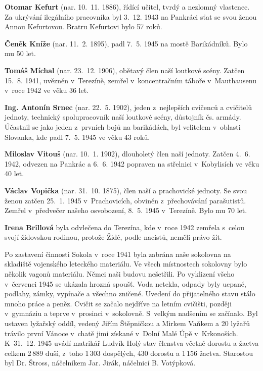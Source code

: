 \documentclass[a5paper, 11pt, twoside]{article}
\begin{document}
\textbf{Otomar Kefurt} (nar. 10.~11. 1886), řídící učitel, tvrdý a
nezlomný vlastenec. Za ukrývání ilegálního pracovníka byl 3.~12. 1943 na
Pankráci sťat se svou ženou Annou Kefurtovou. Bratru Kefurtovi bylo 57
roků.

\textbf{Čeněk Kníže} (nar. 11.~2. 1895), padl 7.~5. 1945 na mostě
Barikádníků. Bylo mu 50 let.

\textbf{Tomáš Míchal} (nar. 23.~12. 1906), obětavý člen naší loutkové
scény. Zatčen 15.~8. 1941, uvězněn v~Terezíně, zemřel v~koncentračním
táboře v~Mauthausenu v~roce 1942 ve věku 36 let.

\textbf{Ing. Antonín Srnec} (nar. 22.~5. 1902), jeden z~nejlepších
cvičenců a cvičitelů jednoty, technický spolupracovník naší loutkové
scény, důstojník čs. armády. Účastnil se jako jeden z~prvních bojů na
barikádách, byl velitelem v~oblasti Slovanka, kde padl 7.~5. 1945 ve
věku 43 roků.

\textbf{Miloslav Vitouš} (nar. 10.~1. 1902), dlouholetý člen naší
jednoty. Zatčen 4.~6. 1942, odvezen na Pankrác a 6.~6. 1942 popraven na
střelnici v~Kobylisích ve věku 40 let.

\textbf{Václav Vopička} (nar. 31.~10. 1875), člen naší a prachovické
jednoty. Se svou ženou zatčen 25.~1. 1945 v~Prachovicích, obviněn
z~přechovávání parašutistů. Zemřel v~předvečer našeho osvobození, 8.~5.
1945 v~Terezíně. Bylo mu 70 let.

\textbf{Irena Brillová} byla odvlečena do Terezína, kde v~roce 1942
zemřela s~celou svojí židovskou rodinou, protože Židé, podle nacistů,
neměli právo žít.

Po zastavení činnosti Sokola v~roce 1941 byla zabrána naše sokolovna na
skladiště vojenského leteckého materiálu. Ve všech místnostech sokolovny
bylo několik vagonů materiálu. Němci naši budovu nešetřili. Po vyklizení
všeho v~červenci 1945 se ukázala hrozná spoušť. Voda netekla, odpady
byly ucpané, podlahy, zámky, vypínače a všechno zničené. Uvedení do
přijatelného stavu stálo mnoho práce a peněz. Cvičit se začalo nejdříve
na letním cvičišti, později v~gymnáziu a teprve v~prosinci v~sokolovně.
S~velkým nadšením se začínalo. Byl ustaven lyžařský oddíl, vedený Jiřím
Štěpničkou a Mirkem Vaňkem a 20 lyžařů trávilo první Vánoce v~chatě jimi
získané v~Dolní Malé Úpě v~Krkonoších. K~31.~12. 1945 uvádí matrikář
Ludvík Holý stav členstva včetně dorostu a žactva celkem 2\,889 duší,
z~toho 1\,303 dospělých, 430 dorostu a 1\,156 žactva. Starostou byl Dr.
Štross, náčelníkem Jar. Jirák, náčelnicí B. Votýpková.
\end{document}

